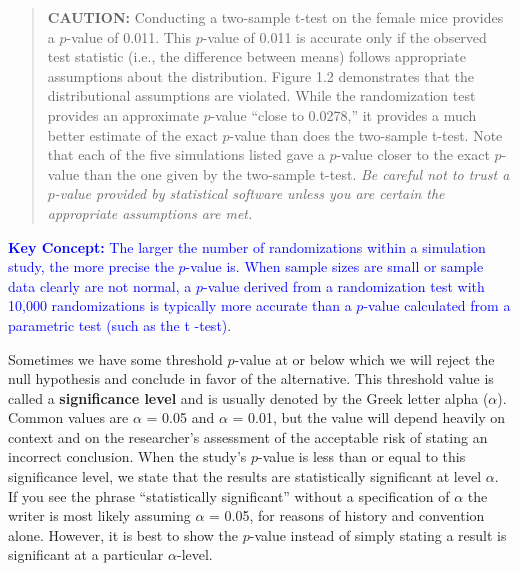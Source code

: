 \documentclass[
]{report}
\begin{document}
\begin{quote}
\textbf{CAUTION:}
Conducting a two-sample t-test on the female mice provides a \(\scriptstyle p\)-value of 0.011. This \(\scriptstyle p\)-value of 0.011 is accurate only if the observed test statistic (i.e., the difference between means) follows appropriate assumptions about the distribution. Figure 1.2 demonstrates that the distributional assumptions are violated. While the randomization test provides an approximate \(\scriptstyle p\)-value ``close to 0.0278,'' it provides a much better estimate of the exact \(\scriptstyle p\)-value than does the two-sample t-test. Note that each of the five simulations listed gave a \(\scriptstyle p\)-value closer to the exact \(\scriptstyle p\)-value than the one given by the two-sample t-test. \textit{Be careful not to trust a $\scriptstyle p$-value provided by statistical software unless you are certain the appropriate assumptions are met.}
\end{quote}

\textbf{\textcolor{blue}{Key Concept:}}
\textcolor{blue}{The larger the number of randomizations within a simulation study, the more precise the $\scriptstyle p$-value is. When sample sizes are small or sample data clearly are not normal, a $\scriptstyle p$-value derived from a randomization test with 10,000 randomizations is typically more accurate than a $\scriptstyle p$-value calculated from a parametric test (such as the t -test).}

Sometimes we have some threshold \(\scriptstyle p\)-value at or below which we will reject the null hypothesis and conclude in favor of the alternative. This threshold value is called a \textbf{significance level} and is usually denoted by the Greek letter alpha (\(\scriptstyle \alpha\)). Common values are \(\scriptstyle \alpha\) = 0.05 and \(\scriptstyle \alpha\) = 0.01, but the value will depend heavily
on context and on the researcher's assessment of the acceptable risk of stating an incorrect conclusion. When the study's \(\scriptstyle p\)-value is less than or equal to this significance level, we state that the results are statistically significant at level \(\scriptstyle \alpha\). If you see the phrase ``statistically significant'' without a specification of \(\scriptstyle \alpha\) the writer is most likely assuming \(\scriptstyle \alpha\) = 0.05, for reasons of history and convention alone. However, it is best to show the \(\scriptstyle p\)-value instead of simply stating a result is significant at a particular \(\scriptstyle \alpha\)-level.
\end{document}
